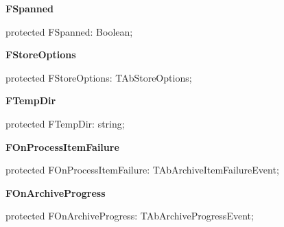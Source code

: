 \documentclass{report}
\newif\ifpdf
\begin{document}
\begin{list}{}
\begin{flushleft}
\ifpdf
\end{flushleft}
\fi


\par  \label{AbArcTyp.TAbArchive-FSpanned}
\item[\textbf{FSpanned}\hfill]
\ifpdf
\begin{flushleft}
\fi
\begin{ttfamily}
protected FSpanned: Boolean;\end{ttfamily}

\ifpdf
\end{flushleft}
\fi


\par  \label{AbArcTyp.TAbArchive-FStoreOptions}
\item[\textbf{FStoreOptions}\hfill]
\ifpdf
\begin{flushleft}
\fi
\begin{ttfamily}
protected FStoreOptions: TAbStoreOptions;\end{ttfamily}

\ifpdf
\end{flushleft}
\fi


\par  \label{AbArcTyp.TAbArchive-FTempDir}
\item[\textbf{FTempDir}\hfill]
\ifpdf
\begin{flushleft}
\fi
\begin{ttfamily}
protected FTempDir: string;\end{ttfamily}

\ifpdf
\end{flushleft}
\fi


\par  \label{AbArcTyp.TAbArchive-FOnProcessItemFailure}
\item[\textbf{FOnProcessItemFailure}\hfill]
\ifpdf
\begin{flushleft}
\fi
\begin{ttfamily}
protected FOnProcessItemFailure: TAbArchiveItemFailureEvent;\end{ttfamily}

\ifpdf
\end{flushleft}
\fi


\par  \label{AbArcTyp.TAbArchive-FOnArchiveProgress}
\item[\textbf{FOnArchiveProgress}\hfill]
\ifpdf
\begin{flushleft}
\fi
\begin{ttfamily}
protected FOnArchiveProgress: TAbArchiveProgressEvent;\end{ttfamily}


\end{flushleft}
\end{list}
\end{document}
